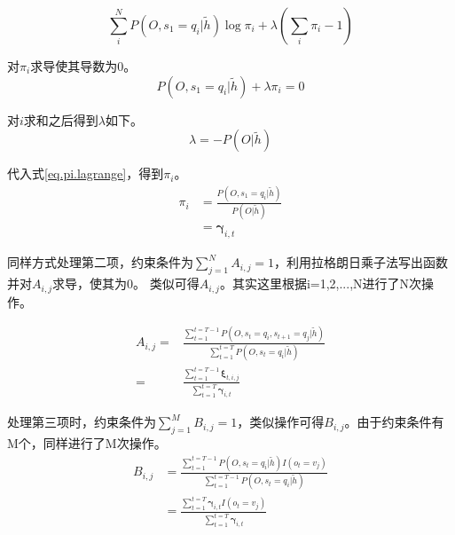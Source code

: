 \documentclass[]{article}
\begin{document}
   \begin{equation}
   	\sum_{i}^{N}P(O,s_{1}=q_{i}|\widetilde{h})\log{\pi_{i}}+\lambda(\sum_{i}\pi_{i}-1)
   \end{equation}
   
    对$\pi_{i}$求导使其导数为0。
   \begin{equation}
   	P(O,s_{1}=q_{i}|\widetilde{h})+\lambda\pi_{i}=0 \label{eq.pi.lagrange}
   \end{equation}
   
    对$i$求和之后得到$\lambda$如下。
   \begin{equation}
   	\lambda=-P(O|\widetilde{h})
   \end{equation}

    代入式\ref{eq.pi.lagrange}，得到$\pi_{i}$。
    \begin{equation}
    	\begin{aligned}
    		\pi_{i}&=\frac{P(O,s_1=q_i|\widetilde{h})}{P(O|\widetilde{h})}\\
    		&=\boldsymbol{\gamma}_{i,t}
    	\end{aligned}
    \end{equation}
  
  同样方式处理第二项，约束条件为$\sum_{j=1}^{N}A_{i,j}=1$，利用拉格朗日乘子法写出函数并对$A_{i,j}$求导，使其为0。
  类似可得$A_{i,j}$。其实这里根据i=1,2,...,N进行了N次操作。
   
  \begin{equation}
  	\begin{aligned}
  		A_{i,j}=&\frac{\sum_{t=1}^{t=T-1}P(O,s_t=q_i, s_{t+1}=q_j|\widetilde{h})}{\sum_{t=1}^{t=T}P(O,s_t=q_i|\widetilde{h})}\\
  		=&\frac{\sum_{t=1}^{t=T-1}\boldsymbol{\xi}_{t,i,j}}{\sum_{t=1}^{t=T}\boldsymbol{\gamma}_{i,t}}
  	\end{aligned}
  \end{equation}

  处理第三项时，约束条件为$\sum_{j=1}^{M}B_{i,j}=1$，类似操作可得$B_{i,j}$。由于约束条件有M个，同样进行了M次操作。
  \begin{equation}
  	\begin{aligned}
  	B_{i,j}&=\frac{\sum_{t=1}^{t=T-1}P(O,s_t=q_i|\widetilde{h})I(o_t=v_j)}{\sum_{t=1}^{t=T-1}P(O,s_t=q_i|\widetilde{h})}\\
  	&=\frac{\sum_{t=1}^{t=T}\boldsymbol{\gamma}_{i,t}I(o_t=v_j)}{\sum_{t=1}^{t=T}\boldsymbol{\gamma}_{i,t}}
  	\end{aligned}
  \end{equation}
  
\end{document}
